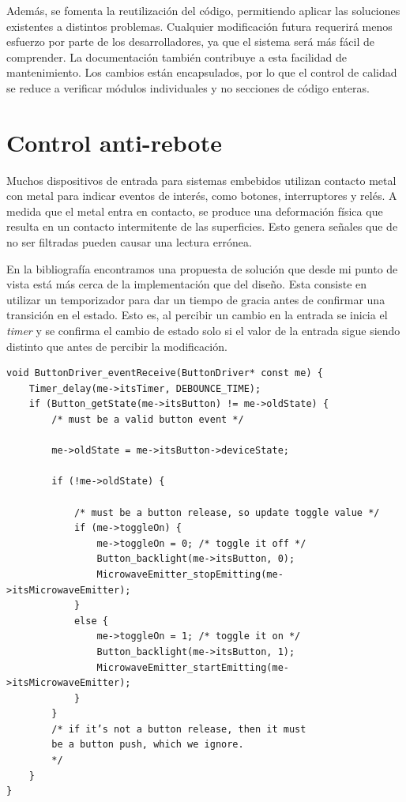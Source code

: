 Además, se fomenta la reutilización del código, permitiendo aplicar las soluciones existentes a distintos problemas. Cualquier modificación futura requerirá menos esfuerzo por parte de los desarrolladores, ya que el sistema será más fácil de comprender. La documentación también contribuye a esta facilidad de mantenimiento. Los cambios están encapsulados, por lo que el control de calidad se reduce a verificar módulos individuales y no secciones de código enteras.


\newpage



\section{Control anti-rebote}
Muchos dispositivos de entrada para sistemas embebidos utilizan contacto metal con metal para indicar eventos de interés, como botones, interruptores y relés. A medida que el metal entra en contacto, se produce una deformación física que resulta en un contacto intermitente de las superficies. Esto genera señales que de no ser filtradas pueden causar una lectura errónea. 

En la bibliografía encontramos una propuesta de solución que desde mi punto de vista está más cerca de la implementación que del diseño. Esta consiste en utilizar un temporizador para dar un tiempo de gracia antes de confirmar una transición en el estado. Esto es, al percibir un cambio en la entrada se inicia el \textit{timer} y se confirma el cambio de estado solo si el valor de la entrada sigue siendo distinto que antes de percibir la modificación. 

\begin{lstlisting}[caption=Código ejemplo]
void ButtonDriver_eventReceive(ButtonDriver* const me) {
    Timer_delay(me->itsTimer, DEBOUNCE_TIME);
    if (Button_getState(me->itsButton) != me->oldState) {
        /* must be a valid button event */
        
        me->oldState = me->itsButton->deviceState;
        
        if (!me->oldState) {
            
            /* must be a button release, so update toggle value */
            if (me->toggleOn) {
                me->toggleOn = 0; /* toggle it off */
                Button_backlight(me->itsButton, 0);
                MicrowaveEmitter_stopEmitting(me->itsMicrowaveEmitter);
            }
            else {
                me->toggleOn = 1; /* toggle it on */
                Button_backlight(me->itsButton, 1);
                MicrowaveEmitter_startEmitting(me->itsMicrowaveEmitter);
            }
        }
        /* if it’s not a button release, then it must
        be a button push, which we ignore.
        */
    }
}
\end{lstlisting}

